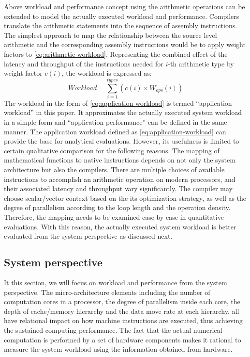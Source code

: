 \documentclass[conference]{IEEEtran}
\begin{document}
Above workload and performance concept using the arithmetic operations
can be extended to model the actually executed workload and performance.
Compilers translate the arithmetic statements into the sequence of
assembly instructions.
The simplest approach to map the relationship between
the source level arithmetic and the corresponding assembly instructions
would be to apply weight factors  to \eqref{eq:arithmetic-workload}.
%
Representing the combined effect of the latency and throughput of the
instructions needed for $ i $-th arithmetic type
by weight factor $ c(i) $, the workload is expressed as:
%
\begin{equation}\label{eq:application-workload}
		Workload = \sum_{i=1}^{types} \left(c(i)\times W_{ops}(i)\right)
\end{equation}
%
The workload in the form of \eqref{eq:application-workload}
is termed ``application workload'' in this paper.
It approximates the actually executed system workload in a simple form
and ``application performance'' can be defined in the same manner.
%
%
The application workload defined as \eqref{eq:application-workload}
can provide the base for analytical evaluations.
However, its usefulness is limited to certain qualitative comparison
for the following reasons.
The mapping of mathematical functions to native instructions 
depends on not only the system architecture but also the compilers.
There are multiple choices of available instructions to accomplish an
arithmetic operation on modern processors, and their associated latency
and throughput vary significantly.
The compiler may choose scalar/vector context based on
the its optimization strategy, as well as the degree of parallelism
according to the loop length and the operation density.
Therefore, the mapping needs to be examined case by case
in quantitative evaluations.
With this reason, the actually executed system workload is better evaluated
from the system perspective as discussed next.

%
\subsection{System perspective}
\label{subsection:system-perspective}

It this section, we will focus on workload and performance from
the system perspective.
The micro-architecture elements including the number of computation cores
in a processor, the degree of parallelism inside each core,
the depth of cache/memory hierarchy and the data move rate at each hierarchy,
all have relational impact on how machine instructions are executed,
thus achieving the sustained computing performance.
The fact that the actual numerical computation is performed by
a set of hardware components makes it rational to measure
the system workload using the information obtained from hardware.
\end{document}
